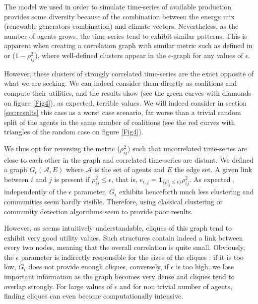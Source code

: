\documentclass[conference]{IEEEtran}
\begin{document}
The model we used in order to simulate time-series of available production provides some diversity because of the combination between the energy mix (renewable generators combination) and climate vectors. Nevertheless, as the number of agents grows, the time-series tend to exhibit similar patterns. This is apparent when creating a correlation graph with similar metric such as defined in \cite{Garas2008} or \cite{Onnela2004} ($ 1 - \rho_{ij}^{2} $), where well-defined clusters appear in the $ \epsilon $-graph for any values of $ \epsilon $. 

However, these clusters of strongly correlated time-series are the exact opposite of what we are seeking. We can indeed consider them directly as coalitions and compute their utilities, and the results show (see the green curves with diamonds on figure \ref{Fig4}), as expected, terrible values. We will indeed consider in section \ref{sec:results} this case as a worst case scenario, far worse than a trivial random split of the agents in the same number of coalitions (see the red curves with triangles of the random case on figure \ref{Fig4}). 

We thus opt for reversing the metric ($ \rho_{ij}^{2} $) such that uncorrelated time-series are close to each other in the graph and correlated time-series are distant. We defined a graph $G_\epsilon(\mathcal{A},E)$ where $\mathcal{A}$ is the set of agents and $ E $ the edge set. A given link between $ i $ and $ j $ is present if $ \rho_{ij}^{2} \leq \epsilon $, that is, $ e_{i,j} = \mathbf{1}_{\{\rho_{ij}^{2} \leq \epsilon \}}\rho_{ij}^{2} $. As expected \cite{Onnela2004}, independently of the $ \epsilon $ parameter, $ G_{\epsilon } $ exhibits henceforth much less clustering and communities seem hardly visible. Therefore, using classical clustering or community detection algorithms seem to provide poor results. 

However, as seems intuitively understandable, cliques of this graph tend to exhibit very good utility values. Such  structures contain indeed a link between every two nodes, meaning that the overall correlation is quite small. Obviously, the $ \epsilon $ parameter is indirectly responsible for the sizes of the cliques : if it is too low, $ G_{\epsilon} $ does not provide enough cliques, conversely, if $\epsilon $ is too high, we lose important information as the graph becomes very dense and cliques tend to overlap strongly. For large values of $ \epsilon $ and for non trivial number of agents, finding cliques can even become computationally intensive. 
\end{document}
